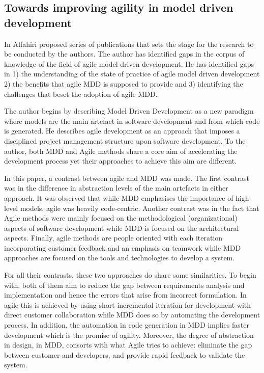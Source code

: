 \documentclass[10pt, a4paper, twocolumn]{article}
\begin{document}
\subsection{Towards improving agility in model driven development}

In \cite{alfraihi2016towards} Alfahiri proposed series of publications that sets the stage for the research to be conducted by the authors. The author has identified gaps in the corpus of knowledge of the field of agile model driven development. He has identified gaps in 1) the understanding of the state of practice of agile model driven development 2) the benefits that agile MDD is supposed to provide and 3) identifying the challenges that beset the adoption of agile MDD.

The author begins by describing Model Driven Development as a new paradigm where models are the main artefact in software development and from which code is generated. He describes agile development as an approach that imposes a disciplined project management structure upon software development. To the author, both MDD and Agile methods share a core aim of accelerating the development process yet their approaches to achieve this aim are different.

In this paper, a contrast between agile and MDD was made. The first contrast was in the difference in abstraction levels of the main artefacts in either approach. It was observed that while MDD emphasises the importance of high-level models, agile was heavily code-centric. Another contrast was in the fact that Agile methods were mainly focused on the methodological (organizational) aspects of software development while MDD is focused on the architectural aspects. Finally, agile methods are people oriented with each iteration incorporating customer feedback and an emphasis on teamwork while MDD approaches are focused on the tools and technologies to develop a system.

For all their contrasts, these two approaches do share some similarities. To begin with, both of them aim to reduce the gap between requirements analysis and implementation and hence the errors that arise from incorrect formulation. In agile this is achieved by using short incremental iteration for development with direct customer collaboration while MDD does so by automating the development process. In addition, the automation in code generation in MDD implies faster development which is the promise of agility. Moreover, the degree of abstraction in design, in MDD, consorts with what Agile tries to achieve: eliminate the gap between customer and developers, and provide rapid feedback to validate the system.
\end{document}
